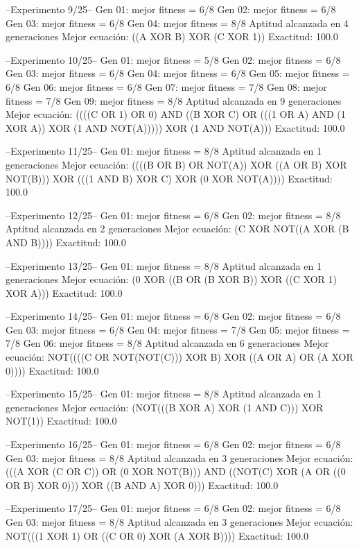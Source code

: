 --Experimento 
 9/25--
Gen 01: mejor fitness = 6/8
Gen 02: mejor fitness = 6/8
Gen 03: mejor fitness = 6/8
Gen 04: mejor fitness = 8/8
Aptitud alcanzada en 4 generaciones
Mejor ecuación: ((A XOR B) XOR (C XOR 1))
 Exactitud: 100.0%

--Experimento 
 10/25--
Gen 01: mejor fitness = 5/8
Gen 02: mejor fitness = 6/8
Gen 03: mejor fitness = 6/8
Gen 04: mejor fitness = 6/8
Gen 05: mejor fitness = 6/8
Gen 06: mejor fitness = 6/8
Gen 07: mejor fitness = 7/8
Gen 08: mejor fitness = 7/8
Gen 09: mejor fitness = 8/8
Aptitud alcanzada en 9 generaciones
Mejor ecuación: ((((C OR 1) OR 0) AND ((B XOR C) OR (((1 OR A) AND (1 XOR A)) XOR (1 AND NOT(A))))) XOR (1 AND NOT(A)))
 Exactitud: 100.0%

--Experimento 
 11/25--
Gen 01: mejor fitness = 8/8
Aptitud alcanzada en 1 generaciones
Mejor ecuación: ((((B OR B) OR NOT(A)) XOR ((A OR B) XOR NOT(B))) XOR (((1 AND B) XOR C) XOR (0 XOR NOT(A))))
 Exactitud: 100.0%

--Experimento 
 12/25--
Gen 01: mejor fitness = 6/8
Gen 02: mejor fitness = 8/8
Aptitud alcanzada en 2 generaciones
Mejor ecuación: (C XOR NOT((A XOR (B AND B))))
 Exactitud: 100.0%

--Experimento 
 13/25--
Gen 01: mejor fitness = 8/8
Aptitud alcanzada en 1 generaciones
Mejor ecuación: (0 XOR ((B OR (B XOR B)) XOR ((C XOR 1) XOR A)))
 Exactitud: 100.0%

--Experimento 
 14/25--
Gen 01: mejor fitness = 6/8
Gen 02: mejor fitness = 6/8
Gen 03: mejor fitness = 6/8
Gen 04: mejor fitness = 7/8
Gen 05: mejor fitness = 7/8
Gen 06: mejor fitness = 8/8
Aptitud alcanzada en 6 generaciones
Mejor ecuación: NOT((((C OR NOT(NOT(C))) XOR B) XOR ((A OR A) OR (A XOR 0))))
 Exactitud: 100.0%

--Experimento 
 15/25--
Gen 01: mejor fitness = 8/8
Aptitud alcanzada en 1 generaciones
Mejor ecuación: (NOT(((B XOR A) XOR (1 AND C))) XOR NOT(1))
 Exactitud: 100.0%

--Experimento 
 16/25--
Gen 01: mejor fitness = 6/8
Gen 02: mejor fitness = 6/8
Gen 03: mejor fitness = 8/8
Aptitud alcanzada en 3 generaciones
Mejor ecuación: (((A XOR (C OR C)) OR (0 XOR NOT(B))) AND ((NOT(C) XOR (A OR ((0 OR B) XOR 0))) XOR ((B AND A) XOR 0)))
 Exactitud: 100.0%

--Experimento 
 17/25--
Gen 01: mejor fitness = 6/8
Gen 02: mejor fitness = 6/8
Gen 03: mejor fitness = 8/8
Aptitud alcanzada en 3 generaciones
Mejor ecuación: NOT(((1 XOR 1) OR ((C OR 0) XOR (A XOR B))))
 Exactitud: 100.0%

